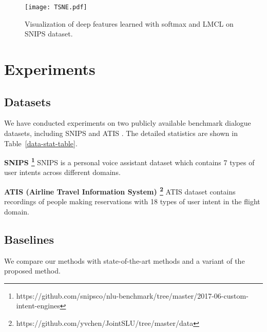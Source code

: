 \documentclass[11pt,a4paper]{article}
\begin{document}
\begin{figure*}[t]
  \centering
  \texttt{[image: TSNE.pdf]}
\caption{ \label{mat} Visualization of deep features  learned with softmax and LMCL on SNIPS dataset.}
\end{figure*}
                                                                                                                                                                                                                                                                                                                                                                                                                                                                                                                                                                                                                                              
\section{Experiments}
\subsection{Datasets}
We have conducted experiments on two publicly available benchmark dialogue datasets, including SNIPS and ATIS \cite{Tr2010WhatIL}. The detailed statistics are shown in Table~\ref{data-stat-table}. 

\textbf{SNIPS \footnote{https://github.com/snipsco/nlu-benchmark/tree/master/2017-06-custom-intent-engines}}
SNIPS is a personal voice assistant dataset which contains 7 types of user intents across different domains.

\textbf{ATIS (Airline Travel Information System) \footnote{https://github.com/yvchen/JointSLU/tree/master/data}} ATIS dataset contains recordings of people making reservations with 18 types of user intent in the flight domain.

\subsection{Baselines}
We compare our methods with state-of-the-art methods and a variant of the proposed method.
\end{document}
